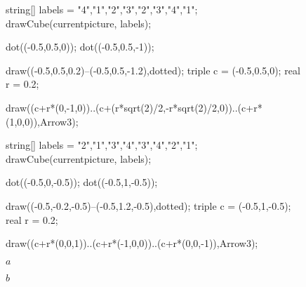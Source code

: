 \documentclass[../gatm_answers.tex]{subfiles}
\begin{document}
\begin{figure}[h]
	\begin{center}
		\begin{minipage}[b]{0.45\textwidth}
			\centering
			\begin{asy}[width=0.7\textwidth]
			string[] labels = {"4","1","2","3","2","3","4","1"};
			drawCube(currentpicture, labels);
			
			dot((-0.5,0.5,0));
			dot((-0.5,0.5,-1));
			
			draw((-0.5,0.5,0.2)--(-0.5,0.5,-1.2),dotted);
			triple c = (-0.5,0.5,0);
			real r = 0.2;
			
			draw((c+r*(0,-1,0))..(c+(r*sqrt(2)/2,-r*sqrt(2)/2,0))..(c+r*(1,0,0)),Arrow3);
			
			\end{asy}
		\end{minipage}
		\hfill
		\begin{minipage}[b]{0.45\textwidth}
			\centering
			\begin{asy}[width=0.7\textwidth]
			string[] labels = {"2","1","3","4","3","4","2","1"};
			drawCube(currentpicture, labels);
			
			dot((-0.5,0,-0.5));
			dot((-0.5,1,-0.5));
			
			draw((-0.5,-0.2,-0.5)--(-0.5,1.2,-0.5),dotted);
			triple c = (-0.5,1,-0.5);
			real r = 0.2;
			
			draw((c+r*(0,0,1))..(c+r*(-1,0,0))..(c+r*(0,0,-1)),Arrow3);
			\end{asy}
		\end{minipage}
	\end{center}
	\vspace*{-2\baselineskip}
	\begin{center}
		\begin{minipage}[t]{0.45\textwidth}
			\centering
			$a$
		\end{minipage}
		\hfill
		\begin{minipage}[t]{0.45\textwidth}
			\centering
			$b$
		\end{minipage}
	\end{center}
	\vspace*{-2\baselineskip}
	\begin{center}
		\begin{minipage}[t]{\textwidth}
			\label{fig:cube_generating_rotations}
		\end{minipage}
	\end{center}
	\vspace*{-2\baselineskip}
\end{figure}
\end{document}

